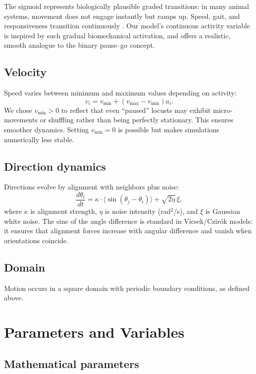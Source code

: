 \documentclass[11pt,a4paper]{article}
\begin{document}
The sigmoid represents biologically plausible graded transitions: in many animal systems, movement does not engage instantly but ramps up. Speed, gait, and responsiveness transition continuously \cite{romanczuk2012active, fukuchi2019gait,couzin2005effective}. 
Our model's continuous activity variable is inspired by such gradual biomechanical activation, and offers a realistic, smooth analogue to the binary pause--go concept.

\subsection{Velocity}
Speed varies between minimum and maximum values depending on activity:
\begin{equation}
v_i = v_{\min} + (v_{\max} - v_{\min}) a_i.
\label{eq:velocity}
\end{equation}
We chose $v_{\min} > 0$ to reflect that even ``paused'' locusts may exhibit micro-movements or shuffling rather than being perfectly stationary. This ensures smoother dynamics. Setting $v_{\min}=0$ is possible but makes simulations numerically less stable.

\subsection{Direction dynamics}
Directions evolve by alignment with neighbors plus noise:
\begin{equation}
\frac{d\theta_i}{dt} = \kappa \cdot \langle \sin(\theta_j - \theta_i)\rangle + \sqrt{2\eta}\,\xi,
\label{eq:direction}
\end{equation}
where $\kappa$ is alignment strength, $\eta$ is noise intensity (rad$^2$/s), and $\xi$ is Gaussian white noise.  
The sine of the angle difference is standard in Vicsek/Czirók models: it ensures that alignment forces increase with angular difference and vanish when orientations coincide.

\subsection{Domain}
Motion occurs in a square domain with periodic boundary conditions, as defined above.


\section{Parameters and Variables}

\subsection{Mathematical parameters}
\end{document}
